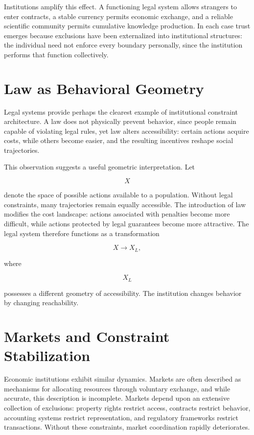 \documentclass[11pt,oneside]{book}
\theoremstyle{plain}
\theoremstyle{definition}
\theoremstyle{remark}
\begin{document}
Institutions amplify this effect. A functioning legal system allows strangers to enter contracts, a stable currency permits economic exchange, and a reliable scientific community permits cumulative knowledge production. In each case trust emerges because exclusions have been externalized into institutional structures: the individual need not enforce every boundary personally, since the institution performs that function collectively.

\section{Law as Behavioral Geometry}

Legal systems provide perhaps the clearest example of institutional constraint architecture. A law does not physically prevent behavior, since people remain capable of violating legal rules, yet law alters accessibility: certain actions acquire costs, while others become easier, and the resulting incentives reshape social trajectories.

This observation suggests a useful geometric interpretation. Let

\begin{equation}
X
\end{equation}

denote the space of possible actions available to a population. Without legal constraints, many trajectories remain equally accessible. The introduction of law modifies the cost landscape: actions associated with penalties become more difficult, while actions protected by legal guarantees become more attractive. The legal system therefore functions as a transformation

\begin{equation}
X
\rightarrow
X_L,
\end{equation}

where

\begin{equation}
X_L
\end{equation}

possesses a different geometry of accessibility. The institution changes behavior by changing reachability.

\section{Markets and Constraint Stabilization}

Economic institutions exhibit similar dynamics. Markets are often described as mechanisms for allocating resources through voluntary exchange, and while accurate, this description is incomplete. Markets depend upon an extensive collection of exclusions: property rights restrict access, contracts restrict behavior, accounting systems restrict representation, and regulatory frameworks restrict transactions. Without these constraints, market coordination rapidly deteriorates.
\end{document}
